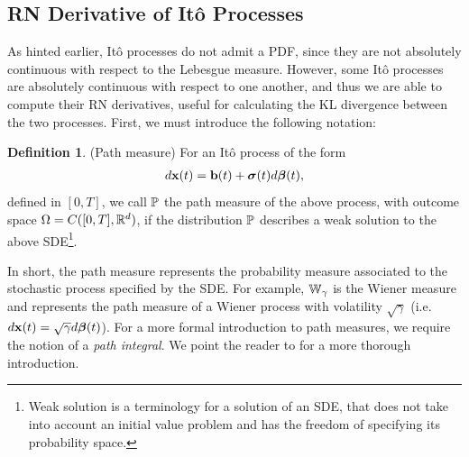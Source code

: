 \documentclass[a4paper,12pt,twoside,openright]{report}
\theoremstyle{definition}
\newtheorem{definition}{Definition}[section]
\begin{document}
\subsection{RN Derivative of Itô Processes}


As hinted earlier, Itô processes do not admit a PDF, since they are not absolutely continuous with respect to the Lebesgue measure. However, some Itô processes are absolutely continuous with respect to one another, and thus we are able to compute their RN derivatives, useful for calculating the KL divergence between the two processes.  First, we must introduce the following notation:
\begin{definition} (Path measure) \label{def:pathmesu}
    For an Itô process of the form
    \begin{align*}
        d\rvx(t) = \rvb(t) + \rvsigma(t) d\rvw(t),
    \end{align*}
    defined in $[0,T]$, we call $\P$ the path measure of the above process, with outcome space $\Omega=C([0,T], \R^d)$, if the distribution $\P$ describes a weak solution to the above SDE\footnote{Weak solution is a terminology for a solution of an SDE, that does not take into account an initial value problem and has the freedom of specifying its probability space.}.
\end{definition}

In short, the path measure represents the probability measure associated to the stochastic process specified by the SDE.  For example, $\W_{\gamma}$ is the Wiener measure and represents the path measure of a Wiener process with volatility $\sqrt{\gamma}$
 (i.e. $d\rvx(t) = \sqrt{\gamma} d \rvw(t)$). For a more formal introduction to path measures, we require the notion of a \textit{path integral}. We point the reader to \cite{sarkka2019applied, oksendal2003stochastic} for a more thorough introduction.
 
\end{document}
